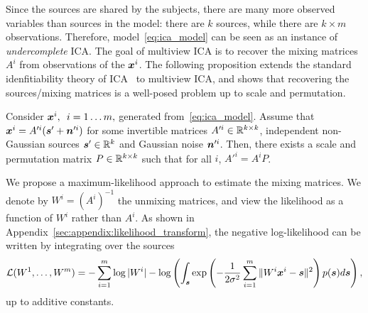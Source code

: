 Since the sources are shared by the subjects, there are many more observed variables than sources in the model: there are $k$ sources, while there are $k \times m$ observations.
%
Therefore, model~\eqref{eq:ica_model} can be seen as an instance of \emph{undercomplete} ICA.
%
The goal of multiview ICA is to recover the mixing matrices $A^i$ from observations of the $\boldsymbol{x}^i$.
%
The following proposition extends the standard idenfitiability theory of ICA~\cite{comon1994independent} to multiview ICA, and shows that recovering the sources/mixing matrices is a well-posed problem up to scale and permutation.
%
\begin{proposition}
\label{prop:identifiability}
Consider $\boldsymbol{x}^i, \enspace i=1\dots m,$ generated from~\eqref{eq:ica_model}. Assume that $\boldsymbol{x}^i = A'^i(\boldsymbol{s}' + \boldsymbol{n}'^i)$ for some invertible matrices $A'^i\in \mathbb{R}^{k\times k}$, independent non-Gaussian sources $\boldsymbol{s}'\in \mathbb{R}^k$ and Gaussian noise $\boldsymbol{n}'^i$. Then, there exists a scale and permutation matrix $P\in \mathbb{R}^{k\times k}$ such that for all $i$, $A'^i = A^i P$.
\end{proposition}
%
%
%
%
%
%
%
We propose a maximum-likelihood approach to estimate the mixing matrices. 
We denote by $W^i = (A^i)^{-1}$ the unmixing matrices, and view the likelihood as a function of $W^i$ rather than $A^i$. As shown in Appendix~\ref{sec:appendix:likelihood_transform}, the negative log-likelihood can be written by integrating over the sources
\begin{equation} 
    \label{eq:likelihood}
    \mathcal{L}(W^1, \dots, W^m) = -\sum_{i=1}^m\log|W^i| - \log\left(\int_{\boldsymbol{s}}\exp\left(-\frac1{2\sigma^2}\sum_{i=1}^m\|W^i\boldsymbol{x}^i - \boldsymbol{s}\|^2\right)p(\boldsymbol{s})d\boldsymbol{s}\right),
\end{equation}
up to additive constants.
